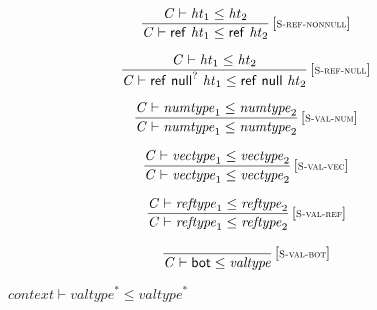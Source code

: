 \vspace{1ex}

$$
\begin{array}{@{}c@{}}\displaystyle
\frac{
{\mathit{C}} \vdash {\mathit{ht}}_{{1}} \leq {\mathit{ht}}_{{2}}
}{
{\mathit{C}} \vdash \mathsf{ref}~{\mathit{ht}}_{{1}} \leq \mathsf{ref}~{\mathit{ht}}_{{2}}
} \, {[\textsc{\scriptsize S{-}ref{-}nonnull}]}
\qquad
\end{array}
$$

$$
\begin{array}{@{}c@{}}\displaystyle
\frac{
{\mathit{C}} \vdash {\mathit{ht}}_{{1}} \leq {\mathit{ht}}_{{2}}
}{
{\mathit{C}} \vdash \mathsf{ref}~{\mathsf{null}^?}~{\mathit{ht}}_{{1}} \leq \mathsf{ref}~\mathsf{null}~{\mathit{ht}}_{{2}}
} \, {[\textsc{\scriptsize S{-}ref{-}null}]}
\qquad
\end{array}
$$

\vspace{1ex}

$$
\begin{array}{@{}c@{}}\displaystyle
\frac{
{\mathit{C}} \vdash {\mathit{numtype}}_{{1}} \leq {\mathit{numtype}}_{{2}}
}{
{\mathit{C}} \vdash {\mathit{numtype}}_{{1}} \leq {\mathit{numtype}}_{{2}}
} \, {[\textsc{\scriptsize S{-}val{-}num}]}
\qquad
\end{array}
$$

$$
\begin{array}{@{}c@{}}\displaystyle
\frac{
{\mathit{C}} \vdash {\mathit{vectype}}_{{1}} \leq {\mathit{vectype}}_{{2}}
}{
{\mathit{C}} \vdash {\mathit{vectype}}_{{1}} \leq {\mathit{vectype}}_{{2}}
} \, {[\textsc{\scriptsize S{-}val{-}vec}]}
\qquad
\end{array}
$$

$$
\begin{array}{@{}c@{}}\displaystyle
\frac{
{\mathit{C}} \vdash {\mathit{reftype}}_{{1}} \leq {\mathit{reftype}}_{{2}}
}{
{\mathit{C}} \vdash {\mathit{reftype}}_{{1}} \leq {\mathit{reftype}}_{{2}}
} \, {[\textsc{\scriptsize S{-}val{-}ref}]}
\qquad
\end{array}
$$

$$
\begin{array}{@{}c@{}}\displaystyle
\frac{
}{
{\mathit{C}} \vdash \mathsf{bot} \leq {\mathit{valtype}}
} \, {[\textsc{\scriptsize S{-}val{-}bot}]}
\qquad
\end{array}
$$

\vspace{1ex}

$\boxed{{\mathit{context}} \vdash {{\mathit{valtype}}^\ast} \leq {{\mathit{valtype}}^\ast}}$


